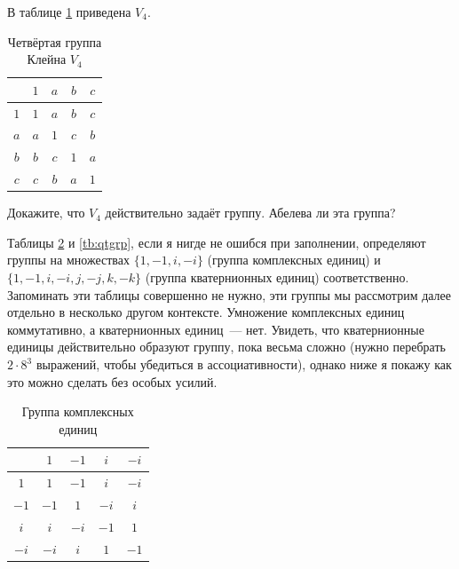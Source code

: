 \begin{example}
	В таблице \ref{tb:v4} приведена  $V_4$.
\end{example}

\begin{table}[h]
	\centering
	\begin{tabular}{c|cccc}
		& $1$ & $a$ & $b$ & $c$ \\ 
		\hline $1$ & $1$ & $a$ & $b$ & $c$ \\ 
		$a$ & $a$ & $1$ & $c$ & $b$ \\ 
		$b$ & $b$ & $c$ & $1$ & $a$ \\ 
		$c$ & $c$ & $b$ & $a$ & $1$ \\ 
	\end{tabular}
	\caption{Четвёртая группа Клейна $V_4$}\label{tb:v4}
\end{table}

\begin{exercise}
	Докажите, что $V_4$ действительно задаёт группу. Абелева ли эта группа?
\end{exercise}

\begin{example}
	Таблицы \ref{tb:cmplxgrp} и \ref{tb:qtgrp}, если я нигде не ошибся при заполнении, определяют группы на множествах $\{1, -1, i, -i\}$ (группа комплексных единиц) и $\{1, -1, i, -i, j, -j, k, -k\}$ (группа кватернионных единиц) соответственно. Запоминать эти таблицы совершенно не нужно, эти группы мы рассмотрим далее отдельно в несколько другом контексте. Умножение комплексных единиц коммутативно, а кватернионных единиц~— нет. Увидеть, что кватернионные единицы действительно образуют группу, пока весьма сложно (нужно перебрать $2\cdot 8^3$ выражений, чтобы убедиться в ассоциативности), однако ниже я покажу как это можно сделать без особых усилий.
\end{example}

\begin{table}[h]
	\centering
	\begin{tabular}{c|cccc}
		& $1$ & $-1$ & $i$ & $-i$ \\ 
		\hline $1$ & $1$ & $-1$ & $i$ & $-i$ \\ 
		$-1$ & $-1$ & $1$ & $-i$ & $i$ \\ 
		$i$ & $i$ & $-i$ & $-1$ & $1$ \\ 
		$-i$ & $-i$ & $i$ & $1$ & $-1$ \\ 
	\end{tabular} 
	\caption{Группа комплексных единиц}\label{tb:cmplxgrp}
\end{table}

